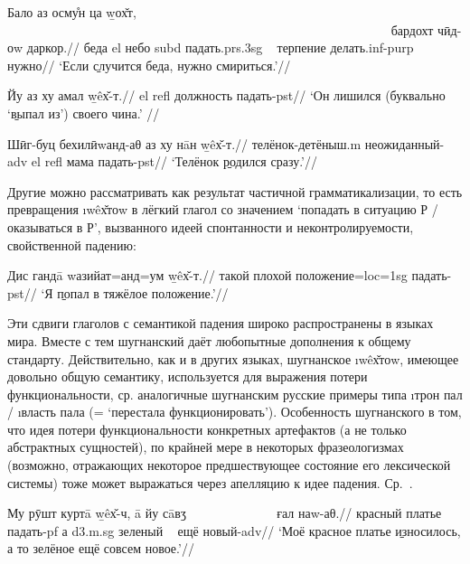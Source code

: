 \begingl
\gla Бало аз осму̊н ца \b{wох̌т}, ~~~~~~~~~~~~~~~~~~~~~~~~~~~~~~~~~~~~~~~~~~~~~~~~~~~~~~~~~~~~ бардохт чӣд-оw даркор.//
\glc беда {\sc el} небо {\sc subd} падать.{\sc prs.3sg} ~ терпение делать.{\sc inf-purp} нужно//
\glft ‘Если \b{случится} беда, нужно смириться.’//
\endgl \xe

\begingl
\gla Йу аз ху амал \b{wêх̌-т}.//
 {\sc el} {\sc refl} должность падать-{\sc pst}//
\glft ‘Он лишился (буквально ‘\b{выпал} из’) своего чина.’ //
\endgl \xe

\begingl
\gla Шӣг-буц бехилӣwанд-аθ аз ху нāн \b{wêх̌-т}.//
\glc телёнок-детёныш.{\sc m} неожиданный-{\sc adv} {\sc el} {\sc refl} мама падать-{\sc pst}//
\glft ‘Телёнок \b{родился} сразу.’//
\endgl \xe

Другие можно рассматривать как результат частичной грамматикализации, то есть превращения \i{wêх̌тоw} в лёгкий глагол со значением ‘попадать в ситуацию Р / оказываться в Р’, вызванного идеей спонтанности и неконтролируемости, свойственной падению:

\begingl
\gla Дис гандā wазийат=анд=ум \b{wêх̌-т}.//
\glc такой плохой положение={\sc loc=1sg} падать-{\sc pst}//
\glft ‘Я \b{попал} в тяжёлое положение.’//
\endgl \xe

Эти сдвиги глаголов с семантикой падения широко распространены в языках мира. Вместе с тем шугнанский даёт любопытные дополнения к общему стандарту. Действительно, как и в других языках, шугнанское \i{wêх̌тоw}, имеющее довольно общую семантику, используется для выражения потери функциональности, ср. аналогичные шугнанским русские примеры типа \i{трон пал} / \i{власть пала} (= ‘перестала функционировать’). Особенность шугнанского в том, что идея потери функциональности конкретных артефактов (а не только абстрактных сущностей), по крайней мере в некоторых фразеологизмах (возможно, отражающих некоторое предшествующее состояние его лексической системы) тоже может выражаться через апелляцию к идее падения. Ср.~\parencites[531]{karamshoev1991}[360]{karamshoev1988}.

\begingl
\gla Му рӯшт куртā \b{wêх̌-ч}, ā йу сāвӡ ~~~~~~~~~~~~~ ғал наw-аθ.//
 красный платье падать-{\sc pf} а {\sc d3.m.sg} зеленый ~ ещё новый-{\sc adv}//
\glft ‘Моё красное платье \b{износилось}, а то зелёное ещё совсем новое.’//
\endgl \xe

